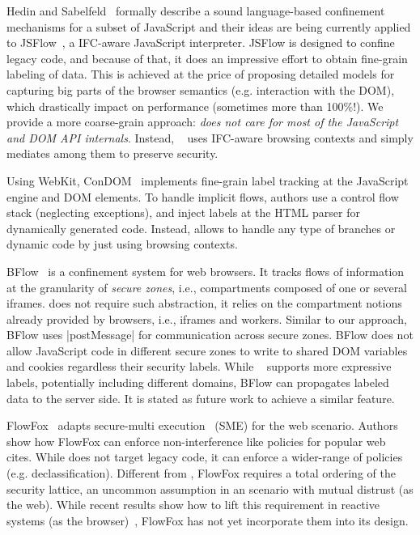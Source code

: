 Hedin and Sabelfeld~\cite{Hedin:2012} formally describe a sound language-based
confinement mechanisms for a subset of JavaScript and their ideas are being
currently applied to JSFlow~\cite{JSFlow}, a IFC-aware JavaScript interpreter.
JSFlow is designed to confine legacy code, and because of that, it does an
impressive effort to obtain fine-grain labeling of data. This is achieved at the
price of proposing detailed models for capturing big parts of the browser
semantics (e.g. interaction with the DOM), which drastically impact on
performance (sometimes more than 100\%!).  We provide a more coarse-grain
approach: \emph{\sys{} does not care for most of the JavaScript and DOM API
  internals}. Instead, \sys~ uses IFC-aware browsing contexts and simply
mediates among them to preserve security.

Using WebKit, ConDOM~\cite{ConDOM} implements fine-grain label tracking at the
JavaScript engine and DOM elements. To handle implicit flows, authors use a
control flow stack (neglecting exceptions), and inject labels at the HTML parser
for dynamically generated code. Instead, \sys{} allows to handle any type of
branches or dynamic code by just using browsing contexts.

BFlow~\cite{Yip:2009:PBS} is a confinement system for web browsers. It tracks
flows of information at the granularity of \emph{secure zones}, i.e.,
compartments composed of one or several iframes.  {\sys} does not require such
abstraction, it relies on the compartment notions already provided by browsers,
i.e., iframes and workers. Similar to our approach, BFlow uses \js|postMessage|
for communication across secure zones. BFlow does not allow JavaScript code in
different secure zones to write to shared DOM variables and cookies regardless
their security labels.  While \sys~ supports more expressive labels, potentially
including different domains, BFlow can propagates labeled data to the server
side. It is stated as future work to achieve a similar feature.

FlowFox~\cite{DeGroef:2012} adapts secure-multi execution~\cite{Devriese:2010}
(SME) for the web scenario. Authors show how FlowFox can enforce
non-interference like policies for popular web cites. While \sys{} does not
target legacy code, it can enforce a wider-range of policies
(e.g. declassification). Different from \sys{}, FlowFox requires a total
ordering of the security lattice, an uncommon assumption in an scenario with
mutual distrust (as the web). While recent results show how to lift this
requirement in reactive systems (as the browser)~\cite{ZanariniJR13}, FlowFox
has not yet incorporate them into its design.




